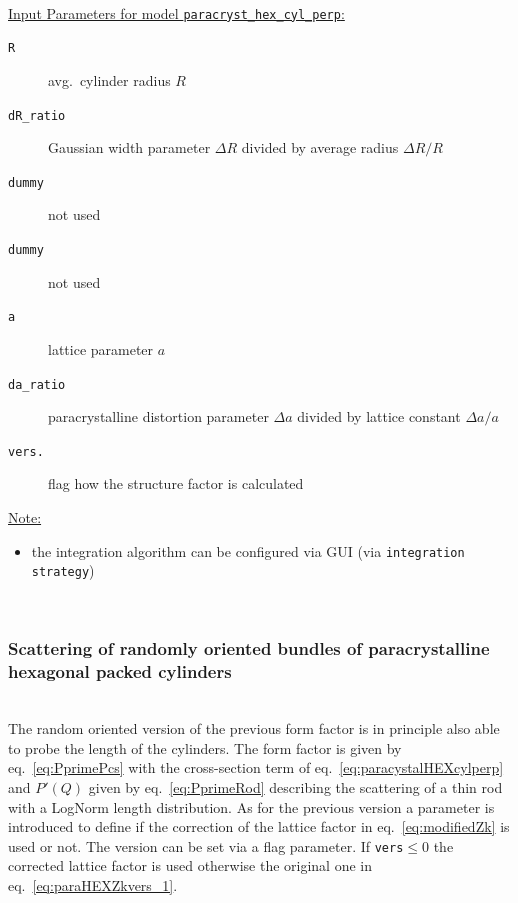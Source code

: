 \hspace{1pt}\\
\uline{Input Parameters for model \texttt{paracryst\_hex\_cyl\_perp}:}\\
\begin{description}
\item[\texttt{R}] avg.\ cylinder radius $R$
\item[\texttt{dR\_ratio}] Gaussian width parameter $\Delta R$ divided by average radius $\Delta R/R$
\item[\texttt{dummy}] not used
\item[\texttt{dummy}] not used
\item[\texttt{a}] lattice parameter $a$
\item[\texttt{da\_ratio}] paracrystalline distortion parameter $\Delta a$ divided by lattice constant $\Delta a/a$
\item[\texttt{vers.}] flag how the structure factor is calculated
\end{description}

\noindent\uline{Note:}
\begin{itemize}
\item the integration algorithm can be configured via GUI (via \texttt{integration strategy})
\end{itemize}

~\\
\subsubsection{Scattering of randomly oriented bundles of paracrystalline hexagonal packed cylinders} ~\\

The random oriented version of the previous form factor is in principle also able to probe the length of the cylinders. The form factor is given by eq.\ \ref{eq:PprimePcs} with the cross-section term of eq.\ \ref{eq:paracystalHEXcylperp} and $P'(Q)$ given by eq.\ \ref{eq:PprimeRod} describing the scattering of a thin rod with a LogNorm length distribution. As for the previous version a parameter is introduced to define if the correction of the lattice factor in eq.\ \ref{eq:modifiedZk} is used or not. The version  can be set via a flag parameter. If \texttt{vers}$\le0$ the corrected lattice factor is used otherwise the original one in eq.\ \ref{eq:paraHEXZkvers_1}.

